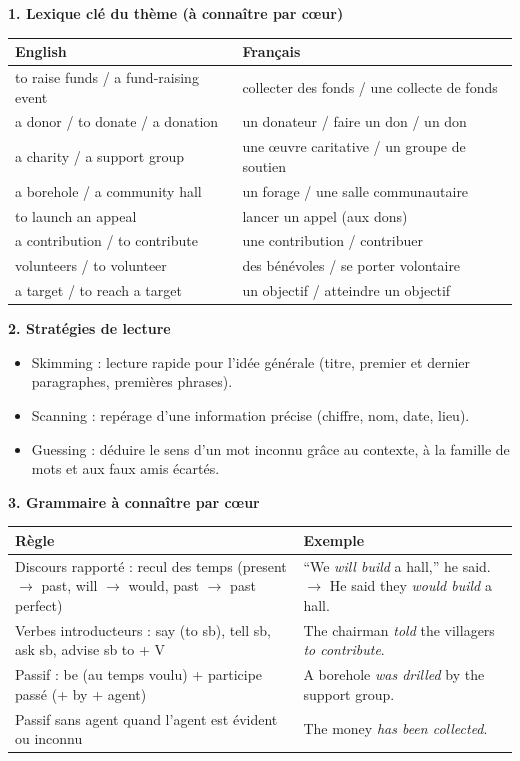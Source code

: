 \documentclass[11pt]{article}
\newcommand{\cle}[1]{{\popxbold\color{popdark}#1}}
\begin{document}
\begin{bilan}
\textbf{1. Lexique clé du thème (à connaître par cœur)}

\begin{center}
\begin{tabularx}{\linewidth}{|X|X|}\hline
\rowcolor{popblueL} \textbf{English} & \textbf{Français} \\ \hline
to raise funds / a fund-raising event & collecter des fonds / une collecte de fonds \\ \hline
a donor / to donate / a donation & un donateur / faire un don / un don \\ \hline
a charity / a support group & une œuvre caritative / un groupe de soutien \\ \hline
a borehole / a community hall & un forage / une salle communautaire \\ \hline
to launch an appeal & lancer un appel (aux dons) \\ \hline
a contribution / to contribute & une contribution / contribuer \\ \hline
volunteers / to volunteer & des bénévoles / se porter volontaire \\ \hline
a target / to reach a target & un objectif / atteindre un objectif \\ \hline
\end{tabularx}
\end{center}

\textbf{2. Stratégies de lecture}
\begin{itemize}
\item \cle{Skimming} : lecture rapide pour l'idée générale (titre, premier et dernier paragraphes, premières phrases).
\item \cle{Scanning} : repérage d'une information précise (chiffre, nom, date, lieu).
\item \cle{Guessing} : déduire le sens d'un mot inconnu grâce au contexte, à la famille de mots et aux faux amis écartés.
\end{itemize}

\textbf{3. Grammaire à connaître par cœur}

\begin{center}
\begin{tabularx}{\linewidth}{|X|X|}\hline
\rowcolor{popgreenL} \textbf{Règle} & \textbf{Exemple} \\ \hline
Discours rapporté : recul des temps (present $\rightarrow$ past, will $\rightarrow$ would, past $\rightarrow$ past perfect) & “We \emph{will build} a hall,” he said. $\rightarrow$ He said they \emph{would build} a hall. \\ \hline
Verbes introducteurs : say (to sb), tell sb, ask sb, advise sb to + V & The chairman \emph{told} the villagers \emph{to contribute}. \\ \hline
Passif : be (au temps voulu) + participe passé (+ by + agent) & A borehole \emph{was drilled} by the support group. \\ \hline
Passif sans agent quand l'agent est évident ou inconnu & The money \emph{has been collected}. \\ \hline
\end{tabularx}
\end{center}


\end{bilan}
\end{document}
